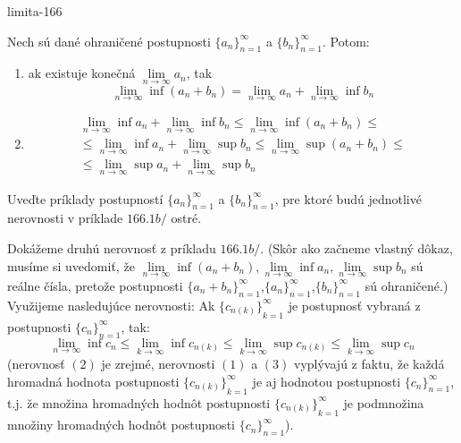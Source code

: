 \begin{defproblem}{limita-166}
\begin{tasks}
\task
    Nech sú dané ohraničené postupnosti ${\{a_n\}}_{n=1}^\infty$ a
    ${\{b_n\}}_{n=1}^\infty$. Potom:
    \begin{enumerate}[leftmargin=0mm]
    \item ak existuje konečná $\lim\limits_{n \rightarrow \infty} a_n$, tak
        \[
            \lim\limits_{n \rightarrow \infty} \inf (a_n+b_n)=\lim\limits_{n \rightarrow
            \infty} a_n+\lim\limits_{n \rightarrow \infty} \inf b_n
        \]
    \item
        \begin{multline*}
            \lim\limits_{n \rightarrow \infty} \inf a_n + \lim\limits_{n \rightarrow
                \infty} \inf b_n
                \leq \lim\limits_{n \rightarrow \infty} \inf (a_n+b_n) \leq \\
            \leq \lim\limits_{n \rightarrow \infty} \inf a_n
                + \lim\limits_{n \rightarrow \infty} \sup b_n \leq
            \lim\limits_{n \rightarrow \infty} \sup (a_n+b_n) \leq \\
            \leq \lim\limits_{n\rightarrow \infty} \sup a_n+\lim\limits_{n \rightarrow \infty} \sup b_n
        \end{multline*}
    \end{enumerate}
\task
    Uveďte príklady postupností ${\{a_n\}}_{n=1}^\infty$ a
    ${\{b_n\}}_{n=1}^\infty$, pre ktoré budú jednotlivé nerovnosti v príklade
    $166.1b/$ ostré.
\end{tasks}

\begin{solution}
    Dokážeme druhú nerovnosť z príkladu $166.1b/$. (Skôr ako začneme vlastný
    dôkaz, musíme si uvedomiť, že $\lim\limits_{n \rightarrow \infty} \inf
    (a_n+b_n),\lim\limits_{n \rightarrow \infty} \inf a_n, \lim\limits_{n
    \rightarrow \infty} \sup b_n$ sú reálne čísla, pretože postupnosti
    ${\{a_n+b_n\}}_{n=1}^\infty$,${\{a_n\}}_{n=1}^\infty$,${\{b_n\}}_{n=1}^\infty$
    sú ohraničené.) Využijeme nasledujúce nerovnosti: Ak
    ${\{c_{n(k)}\}}_{k=1}^\infty$ je postupnosť vybraná z postupnosti
    $\{c_n\}_{n=1}^\infty$, tak:
    \[
        \lim\limits_{n \rightarrow \infty} \inf c_n
        \leq \lim\limits_{k \rightarrow \infty} \inf c_{n(k)} \leq \lim\limits_{k
        \rightarrow \infty} \sup c_{n(k)}\leq \lim\limits_{k \rightarrow \infty}
        \sup c_n
    \]
    (nerovnosť $(2)$ je zrejmé, nerovnosti $(1)$ a $(3)$ vyplývajú z
    faktu, že každá hromadná hodnota postupnosti ${\{c_{n(k)}\}}_{k=1}^\infty$
    je aj hodnotou postupnosti ${\{c_n\}}_{n=1}^\infty$, t.j. že množina
    hromadných hodnôt postupnosti ${\{c_{n(k)}\}}_{k=1}^\infty$ je podmnožina
    množiny hromadných hodnôt postupnosti ${\{c_n\}}_{n=1}^\infty$).


\end{solution}
\end{defproblem}
